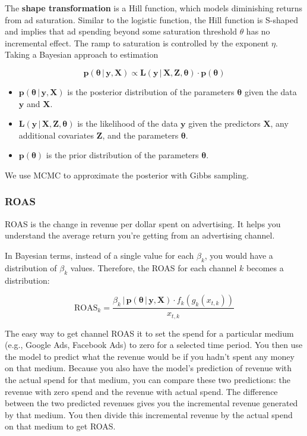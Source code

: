 \documentclass{article}
\begin{document}
The \textbf{shape transformation} is a Hill function, which models diminishing returns from ad saturation. Similar to the logistic function, the Hill function is S-shaped and implies that ad spending beyond some saturation threshold $\theta$ has no incremental effect. The ramp to saturation is controlled by the exponent $\eta$. \\


Taking a Bayesian approach to estimation

\[
\mathbf{p}(\boldsymbol{\theta} \,|\, \mathbf{y}, \mathbf{X}) \propto \mathbf{L}(\mathbf{y} \,|\, \mathbf{X}, \mathbf{Z}, \boldsymbol{\theta}) \cdot \mathbf{p}(\boldsymbol{\theta})
\]

\begin{itemize}
  \item \( \mathbf{p}(\boldsymbol{\theta} \,|\, \mathbf{y}, \mathbf{X}) \) is the posterior distribution of the parameters \( \boldsymbol{\theta} \) given the data \( \mathbf{y} \) and \( \mathbf{X} \).
  \item \( \mathbf{L}(\mathbf{y} \,|\, \mathbf{X}, \mathbf{Z}, \boldsymbol{\theta}) \) is the likelihood of the data \( \mathbf{y} \) given the predictors \( \mathbf{X} \), any additional covariates \( \mathbf{Z} \), and the parameters \( \boldsymbol{\theta} \).
  \item \( \mathbf{p}(\boldsymbol{\theta}) \) is the prior distribution of the parameters \( \boldsymbol{\theta} \).
\end{itemize}

We use MCMC to approximate the posterior with Gibbs sampling.

\subsubsection{ROAS}

ROAS is the change in revenue per dollar spent on advertising. It helps you understand the average return you're getting from an advertising channel.

In Bayesian terms, instead of a single value for each $\beta_k$, you would have a distribution of $\beta_k$ values. Therefore, the ROAS for each channel 
$k$ becomes a distribution:

\[
\text{ROAS}_{k} = \frac{\beta_k \,|\, \mathbf{p}(\boldsymbol{\theta} \,|\, \mathbf{y}, \mathbf{X}) \cdot f_k(g_k(x_{t,k}))}{x_{t,k}}
\]

The easy way to get channel ROAS it to set the spend for a particular medium (e.g., Google Ads, Facebook Ads) to zero for a selected time period. You then use the model to predict what the revenue would be if you hadn't spent any money on that medium. Because you also have the model's prediction of revenue with the actual spend for that medium, you can compare these two predictions: the revenue with zero spend and the revenue with actual spend. The difference between the two predicted revenues gives you the incremental revenue generated by that medium. You then divide this incremental revenue by the actual spend on that medium to get ROAS.
\end{document}
